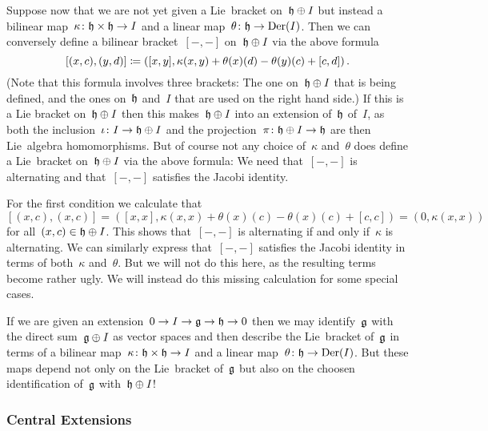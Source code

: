 \begin{remark}
  Suppose now that we are not yet given a Lie~bracket on~$\mathfrak{h} \oplus I$ but instead a bilinear map~$\kappa \colon \mathfrak{h} \times \mathfrak{h} \to I$ and a linear map~$\theta \colon \mathfrak{h} \to \operatorname{Der}(I)$.
  Then we can conversely define a bilinear bracket~$[-,-]$ on~$\mathfrak{h} \oplus I$ via the above formula
  \[
    [ (x,c), (y,d) ]
    \coloneqq
    ( [x,y], \kappa(x,y) + \theta(x)(d) - \theta(y)(c) + [c,d] )  \,.
  \]
  (Note that this formula involves three brackets:
  The one on~$\mathfrak{h} \oplus I$ that is being defined, and the ones on~$\mathfrak{h}$ and~$I$ that are used on the right hand side.)
  If this is a Lie bracket on~$\mathfrak{h} \oplus I$ then this makes~$\mathfrak{h} \oplus I$ into an extension of~$\mathfrak{h}$ of~$I$, as both the inclusion~$\iota \colon I \to \mathfrak{h} \oplus I$ and the projection~$\pi \colon \mathfrak{h} \oplus I \to \mathfrak{h}$ are then Lie~algebra homomorphisms.
  But of course not any choice of~$\kappa$ and~$\theta$ does define a Lie~bracket on~$\mathfrak{h} \oplus I$ via the above formula:
  We need that~$[-,-]$ is alternating and that~$[-,-]$ satisfies the Jacobi identity.
  
  For the first condition we calculate that
  \[
    [(x,c), (x,c)]
    =
    ( [x,x], \kappa(x,x) + \theta(x)(c) - \theta(x)(c) + [c,c] )
    =
    (0, \kappa(x,x))
  \]
  for all~$(x, c) \in \mathfrak{h} \oplus I$.
  This shows that~$[-,-]$ is alternating if and only if~$\kappa$ is alternating.
  We can similarly express that~$[-,-]$ satisfies the Jacobi identity in terms of both~$\kappa$ and~$\theta$.
  But we will not do this here, as the resulting terms become rather ugly.
  We will instead do this missing calculation for some special cases.
\end{remark}


\begin{warning}
  If we are given an extension~$0 \to I \to \mathfrak{g} \to \mathfrak{h} \to 0$ then we may identify~$\mathfrak{g}$ with the direct sum~$\mathfrak{g} \oplus I$ as vector spaces and then describe the Lie~bracket of~$\mathfrak{g}$ in terms of a bilinear map~$\kappa \colon \mathfrak{h} \times \mathfrak{h} \to I$ and a linear map~$\theta \colon \mathfrak{h} \to \operatorname{Der}(I)$.
  But these maps depend not only on the Lie~bracket of~$\mathfrak{g}$ but also on the choosen identification of~$\mathfrak{g}$ with~$\mathfrak{h} \oplus I$!
\end{warning}



\subsubsection{Central Extensions}


